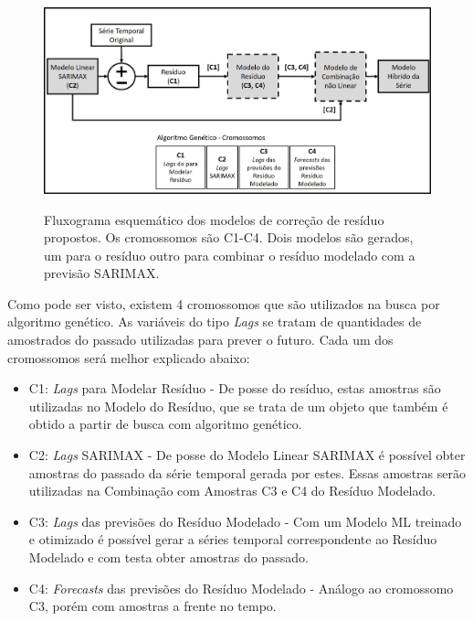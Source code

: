 \begin{figure}[htbp]
    \centering
    \caption{Fluxograma esquemático dos modelos de correção de resíduo propostos. Os cromossomos são C1-C4. Dois modelos são gerados, um para o resíduo outro para combinar o resíduo modelado com a previsão SARIMAX.}
    \includegraphics[width=\textwidth]{Figuras/cap5/fluxograma_cromossomos.jpg}
    \label{fig:cap5_fluxograma_cromossomo}
\end{figure}

Como pode ser visto, existem 4 cromossomos que são utilizados na busca por algoritmo genético. As variáveis do tipo \textit{Lags} se tratam de quantidades de amostrados do passado utilizadas para prever o futuro. Cada um dos cromossomos será melhor explicado abaixo:

\begin{itemize}
    \item C1: \textit{Lags} para Modelar Resíduo - De posse do resíduo, estas amostras são utilizadas no Modelo do Resíduo, que se trata de um objeto que também é obtido a partir de busca com algoritmo genético.
    
    \item C2: \textit{Lags} SARIMAX - De posse do Modelo Linear SARIMAX é possível obter amostras do passado da série temporal gerada por estes. Essas amostras serão utilizadas na Combinação com Amostras C3 e C4 do Resíduo Modelado.
    
    \item C3: \textit{Lags} das previsões do Resíduo Modelado - Com um Modelo ML treinado e otimizado é possível gerar a séries temporal correspondente ao Resíduo Modelado e com testa obter amostras do passado.
    
    \item C4: \textit{Forecasts} das previsões do Resíduo Modelado - Análogo ao cromossomo C3, porém com amostras a frente no tempo.
\end{itemize}

